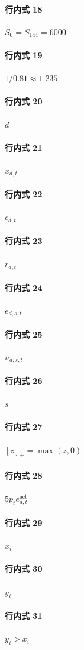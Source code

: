 \documentclass[12pt]{article}
\begin{document}
\paragraph{行内式 18}
\(S_0=S_{144}=6000\)
\paragraph{行内式 19}
\(1/0.81\approx1.235\)
\paragraph{行内式 20}
\(d\)
\paragraph{行内式 21}
\(x_{d,t}\)
\paragraph{行内式 22}
\(c_{d,t}\)
\paragraph{行内式 23}
\(r_{d,t}\)
\paragraph{行内式 24}
\(e_{d,s,t}\)
\paragraph{行内式 25}
\(u_{d,s,t}\)
\paragraph{行内式 26}
\(s\)
\paragraph{行内式 27}
\([z]_+=\max(z,0)\)
\paragraph{行内式 28}
\(5p_t e^{\mathrm{act}}_{d,t}\)
\paragraph{行内式 29}
\(x_i\)
\paragraph{行内式 30}
\(y_i\)
\paragraph{行内式 31}
\(y_i>x_i\)
\end{document}
